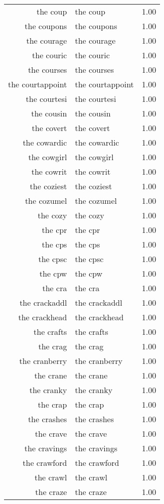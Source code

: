 \begin{table}[ht]
\begin{tabular}{rlr}
  the coup & the coup & 1.00 \\ 
  the coupons & the coupons & 1.00 \\ 
  the courage & the courage & 1.00 \\ 
  the couric & the couric & 1.00 \\ 
  the courses & the courses & 1.00 \\ 
  the courtappoint & the courtappoint & 1.00 \\ 
  the courtesi & the courtesi & 1.00 \\ 
  the cousin & the cousin & 1.00 \\ 
  the covert & the covert & 1.00 \\ 
  the cowardic & the cowardic & 1.00 \\ 
  the cowgirl & the cowgirl & 1.00 \\ 
  the cowrit & the cowrit & 1.00 \\ 
  the coziest & the coziest & 1.00 \\ 
  the cozumel & the cozumel & 1.00 \\ 
  the cozy & the cozy & 1.00 \\ 
  the cpr & the cpr & 1.00 \\ 
  the cps & the cps & 1.00 \\ 
  the cpsc & the cpsc & 1.00 \\ 
  the cpw & the cpw & 1.00 \\ 
  the cra & the cra & 1.00 \\ 
  the crackaddl & the crackaddl & 1.00 \\ 
  the crackhead & the crackhead & 1.00 \\ 
  the crafts & the crafts & 1.00 \\ 
  the crag & the crag & 1.00 \\ 
  the cranberry & the cranberry & 1.00 \\ 
  the crane & the crane & 1.00 \\ 
  the cranky & the cranky & 1.00 \\ 
  the crap & the crap & 1.00 \\ 
  the crashes & the crashes & 1.00 \\ 
  the crave & the crave & 1.00 \\ 
  the cravings & the cravings & 1.00 \\ 
  the crawford & the crawford & 1.00 \\ 
  the crawl & the crawl & 1.00 \\ 
  the craze & the craze & 1.00 \\ 

\end{tabular}
\end{table}
